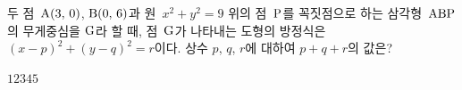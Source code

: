 두 점~$\mathrm{A}(3,\mkern3mu 0)$, $\mathrm{B}(0,\mkern3mu 6)$과 원~$x^2+y^2=9$ 위의 점~$\mathrm{P}$를 꼭짓점으로 하는 삼각형~$\mathrm{ABP}$의 무게중심을 $\mathrm{G}$라 할 때, 점~$\mathrm{G}$가 나타내는 도형의 방정식은 $(x-p)^2+(y-q)^2=r$이다. 상수 $p$, $q$, $r$에 대하여 $p+q+r$의 값은? 
\begin{choices32}{$1$}{$2$}{$3$}{$4$}{$5$}\end{choices32}
